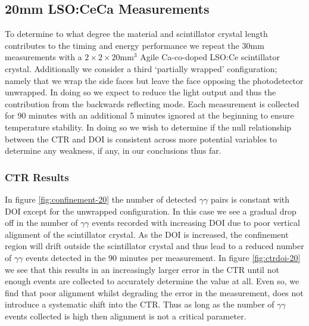 \subsection{20mm LSO:CeCa Measurements}
\label{sec:20mm}

To determine to what degree the material and scintillator crystal length contributes to the timing and energy performance we repeat the 30mm measurements with a $2\times2\times20$mm$^3$ Agile Ca-co-doped LSO:Ce scintillator crystal. Additionally we consider a third `partially wrapped' configuration; namely that we wrap the side faces but leave the face opposing the photodetector unwrapped. In doing so we expect to reduce the light output and thus the contribution from the backwards reflecting mode. Each measurement is collected for 90 minutes with an additional 5 minutes ignored at the beginning to ensure temperature stability. In doing so we wish to determine if the null relationship between the CTR and DOI is consistent across more potential variables  to determine any weakness, if any, in our conclusions thus far.

\subsubsection{CTR Results}
In figure \ref{fig:confinement-20} the number of detected $\gamma\gamma$ pairs is constant with DOI except for the unwrapped configuration. In this case we see a gradual drop off in the number of $\gamma\gamma$ events recorded with increasing DOI due to poor vertical alignment of the scintillator crystal. As the DOI is increased, the confinement region will drift outside the scintillator crystal and thus lead to a reduced number of $\gamma\gamma$ events detected in the 90 minutes per measurement. In figure \ref{fig:ctrdoi-20} we see that this results in an increasingly larger error in the CTR until not enough events are collected to accurately determine the value at all. Even so, we find that poor alignment whilst degrading the error in the measurement, does not introduce a systematic shift into the CTR. Thus as long as the number of $\gamma\gamma$ events collected is high then alignment is not a critical parameter. 
